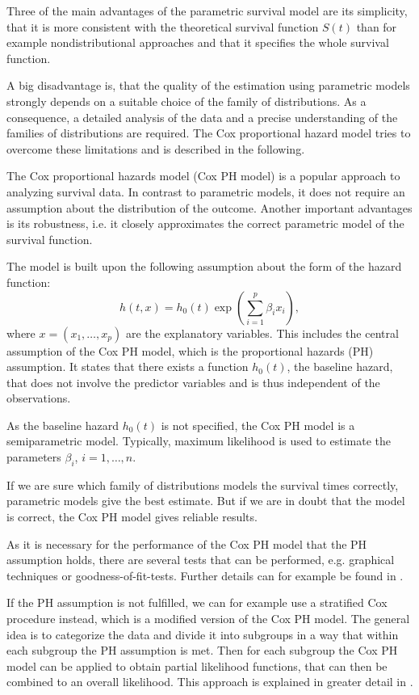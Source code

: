 \documentclass[12pt, a4paper]{article}
\theoremstyle{definition}
\theoremstyle{plain}
\numberwithin{equation}{section}
\numberwithin{figure}{section}
\numberwithin{table}{section}
\begin{document}
	Three of the main advantages of the parametric survival model are its simplicity,  that it is more consistent with the theoretical survival function $S(t)$ than for example nondistributional approaches and that it specifies the whole survival function.
	
	A big disadvantage is, that the quality of the estimation using parametric models strongly depends on a suitable choice of the family of distributions.
	As a consequence, a detailed analysis of the data and a precise understanding of the families of distributions are required.
	The Cox proportional hazard model tries to overcome these limitations and is described in the following.
	
	The Cox proportional hazards model (Cox PH model) is a popular approach to analyzing survival data.
	In contrast to parametric models, it does not require an assumption about the distribution of the outcome.
	Another important advantages is its robustness, i.e. it closely approximates the correct parametric model of the survival function.
	
	The model is built upon the following assumption about the form of the hazard function:
	\begin{equation*}
	h(t,x) = h_0(t) \exp \left(\sum_{i=1}^p \beta_i x_i\right),
	\end{equation*}
	where $x=(x_1,\dots,x_p)$ are the explanatory variables.
	This includes the central assumption of the Cox PH model, which is the proportional hazards (PH) assumption.
	It states that there exists a function $h_0(t)$, the baseline hazard, that does not involve the predictor variables and is thus independent of the observations.
	
	As the baseline hazard $h_0(t)$ is not specified, the Cox PH model is a semiparametric model.
	Typically, maximum likelihood is used to estimate the parameters $\beta_i$, $i=1,\dots ,n$.
	
	If we are sure which family of distributions models the survival times correctly, parametric models give the best estimate.
	But if we are in doubt that the model is correct, the Cox PH model gives reliable results.
	
	As it is necessary for the performance of the Cox PH model that the PH assumption holds, there are several tests that can be performed, e.g. graphical techniques or goodness-of-fit-tests.
	Further details can for example be found in \citet*{sabook}.
	
	If the PH assumption is not fulfilled, we can for example use a stratified Cox procedure instead, which is a modified version of the Cox PH model.
	The general idea is to categorize the data and divide it into subgroups in a way that within each subgroup the PH assumption is met.
	Then for each subgroup the Cox PH model can be applied to obtain partial likelihood functions, that can then be combined to an overall likelihood.
	This approach is explained in greater detail in \citet*{sabook}.
	
\end{document}
